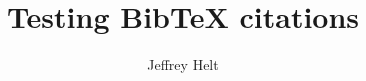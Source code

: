 \documentclass[10pt,twocolumn]{article}
\title{\sffamily\fontsize{18}{18}
\textbf{Testing BibTeX citations}}
\author{\large Jeffrey Helt}
\begin{document}
\maketitle

\begin{sloppypar}

\begin{small}

\end{small}

\begin{small}


\end{small}


\end{sloppypar}
\end{document}
